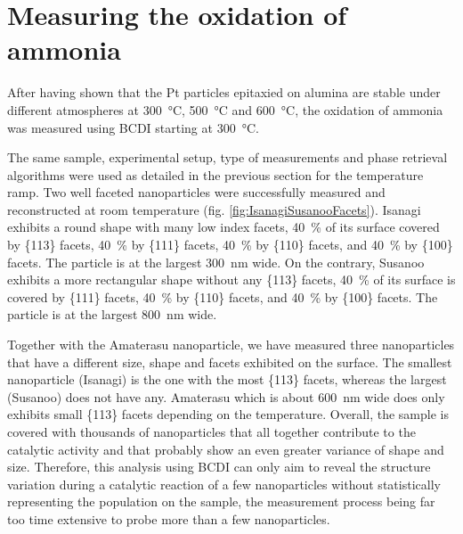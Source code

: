 \section{Measuring the oxidation of ammonia}\label{sec:BCDIAmmoniaOxidation}


After having shown that the Pt particles epitaxied on alumina are stable under different atmospheres at \qty{300}{\degreeCelsius}, \qty{500}{\degreeCelsius} and \qty{600}{\degreeCelsius}, the oxidation of ammonia was measured using BCDI starting at \qty{300}{\degreeCelsius}.

The same sample, experimental setup, type of measurements and phase retrieval algorithms were used as detailed in the previous section for the temperature ramp.
Two well faceted nanoparticles were successfully measured and reconstructed at room temperature (fig. \ref{fig:IsanagiSusanooFacets}).
Isanagi exhibits a round shape with many low index facets, \qty{40}{\percent} of its surface covered by \{113\} facets, \qty{40}{\percent} by \{111\} facets, \qty{40}{\percent} by \{110\} facets, and \qty{40}{\percent} by \{100\} facets.
The particle is at the largest \qty{300}{\nm} wide.
On the contrary, Susanoo exhibits a more rectangular shape without any \{113\} facets, \qty{40}{\percent} of its surface is covered by \{111\} facets, \qty{40}{\percent} by \{110\} facets, and \qty{40}{\percent} by \{100\} facets.
The particle is at the largest \qty{800}{\nm} wide.

Together with the Amaterasu nanoparticle, we have measured three nanoparticles that have a different size, shape and facets exhibited on the surface.
The smallest nanoparticle (Isanagi) is the one with the most \{113\} facets, whereas the largest (Susanoo) does not have any.
Amaterasu which is about \qty{600}{\nm} wide does only exhibits small \{113\} facets depending on the temperature.
Overall, the sample is covered with thousands of nanoparticles that all together contribute to the catalytic activity and that probably show an even greater variance of shape and size.
Therefore, this analysis using BCDI can only aim to reveal the structure variation during a catalytic reaction of a few nanoparticles without statistically representing the population on the sample, the measurement process being far too time extensive to probe more than a few nanoparticles.

